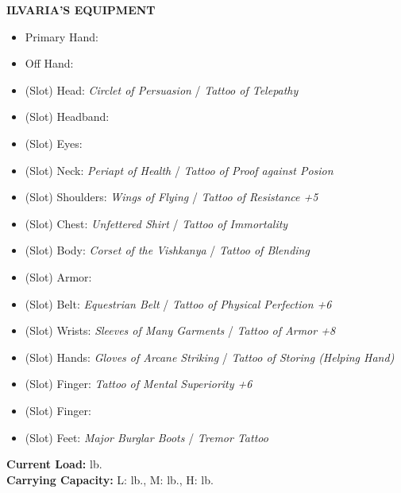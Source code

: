 \newpage

\textbf{ILVARIA'S EQUIPMENT}

\begin{itemize}
\item Primary Hand: 
\item Off Hand: 
\item (Slot) Head: \textit{Circlet of Persuasion} / \textit{Tattoo of Telepathy}
\item (Slot) Headband: 
\item (Slot) Eyes: 
\item (Slot) Neck: \textit{Periapt of Health} / \textit{Tattoo of Proof against Posion}
\item (Slot) Shoulders: \textit{Wings of Flying} / \textit{Tattoo of Resistance +5}
\item (Slot) Chest: \textit{Unfettered Shirt} / \textit{ \hspace{1pt} Tattoo of Immortality}
\item (Slot) Body: \textit{Corset of the Vishkanya} / \textit{ \hspace{1pt} Tattoo of Blending}
\item (Slot) Armor:
\item (Slot) Belt: \textit{Equestrian Belt} / \textit{ \hspace{1pt} Tattoo of Physical Perfection +6}
\item (Slot) Wrists: \textit{Sleeves of Many Garments} / \textit{Tattoo of Armor +8}
\item (Slot) Hands: \textit{Gloves of Arcane Striking} / \textit{Tattoo of Storing (\textit{Helping Hand})}
\item (Slot) Finger: \textit{Tattoo of Mental Superiority +6}
\item (Slot) Finger: 
\item (Slot) Feet: \textit{Major Burglar Boots} / \textit{Tremor Tattoo} \\ 
\end{itemize}

\vspace{10pt}


\textbf{Current Load:}  lb. \\
\textbf{Carrying Capacity:} L:  lb., M:  lb., H:  lb. \\

